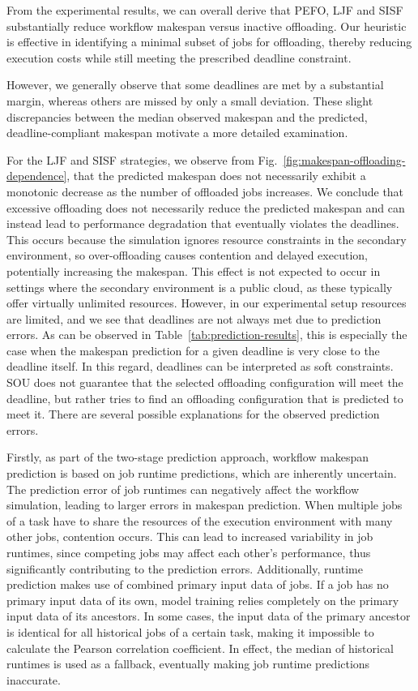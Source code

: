 From the experimental results, we can overall derive that PEFO, LJF and SISF substantially reduce workflow makespan versus inactive offloading. Our heuristic is effective in identifying a minimal subset of jobs for offloading, thereby reducing execution costs while still meeting the prescribed deadline constraint. 

However, we generally observe that some deadlines are met by a substantial margin, whereas others are missed by only a small deviation. These slight discrepancies between the median observed makespan and the predicted, deadline-compliant makespan motivate a more detailed examination.

For the LJF and SISF strategies, we observe from Fig.~\ref{fig:makespan-offloading-dependence}, that the predicted makespan does not necessarily exhibit a monotonic decrease as the number of offloaded jobs increases. We conclude that excessive offloading does not necessarily reduce the predicted makespan and can instead lead to performance degradation that eventually violates the deadlines. This occurs because the simulation ignores resource constraints in the secondary environment, so over-offloading causes contention and delayed execution, potentially increasing the makespan. This effect is not expected to occur in settings where the secondary environment is a public cloud, as these typically offer virtually unlimited resources.
However, in our experimental setup resources are limited, and we see that deadlines are not always met due to prediction errors. As can be observed in Table~\ref{tab:prediction-results}, this is especially the case when the makespan prediction for a given deadline is very close to the deadline itself. In this regard, deadlines can be interpreted as soft constraints. SOU does not guarantee that the selected offloading configuration will meet the deadline, but rather tries to find an offloading configuration that is predicted to meet it. 
There are several possible explanations for the observed prediction errors.

Firstly, as part of the two-stage prediction approach, workflow makespan prediction is based on job runtime predictions, which are inherently uncertain. The prediction error of job runtimes can negatively affect the workflow simulation, leading to larger errors in makespan prediction. 
When multiple jobs of a task have to share the resources of the execution environment with many other jobs, contention occurs. This can lead to increased variability in job runtimes, since competing jobs may affect each other's performance, thus significantly contributing to the prediction errors. Additionally, runtime prediction makes use of combined primary
input data of jobs. If a job has no primary input data of its own, model training relies completely on the primary input data of its ancestors. In some cases, the input data of the primary ancestor is identical for all historical jobs of a certain task, making it impossible to calculate the Pearson correlation coefficient. In effect, the median of historical runtimes is used as a fallback, eventually making job runtime predictions inaccurate. 

